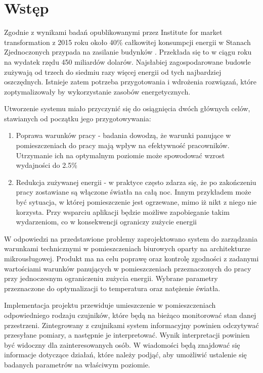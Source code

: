 \newpage %
\section{Wstęp}

Zgodnie z wynikami badań opublikowanymi przez Institute for market transformation z 
2015 roku około 40\% całkowitej konsumpcji energii w Stanach Zjednoczonych przypada na zasilanie budynków 
\cite{Imt.org2015}. Przekłada się to w ciągu roku na wydatek rzędu 450 miliardów 
dolarów. Najsłabiej zagospodarowane budowle zużywają od trzech do siedmiu razy więcej 
energii od tych najbardziej oszczędnych. Istnieje zatem potrzeba przygotowania 
i wdrożenia rozwiązań, które zoptymalizowały by wykorzystanie zasobów energetycznych. 

Utworzenie systemu miało przyczynić się do osiągnięcia dwóch głównych 
celów, stawianych od początku jego przygotowywania:

\begin{enumerate}
    \item Poprawa warunków pracy - badania \cite{oseland2012} dowodzą, że 
    warunki panujące w pomieszczeniach do pracy mają wpływ na efektywność pracowników. 
    Utrzymanie ich na optymalnym poziomie może spowodować wzrost wydajności do 2.5\%
    \item Redukcja zużywanej energii - w praktyce często zdarza się, że po zakończeniu 
    pracy zostawiane są włączone światła na całą noc. Innym przykładem może być 
    sytuacja, w której pomieszczenie jest ogrzewane, mimo iż nikt z niego nie korzysta. 
    Przy wsparciu aplikacji będzie możliwe zapobieganie takim wydarzeniom, co w 
    konsekwencji ograniczy zużycie energii
\end{enumerate}

W odpowiedzi na przedstawione problemy zaprojektowano system do 
zarządzania warunkami technicznymi w pomieszczeniach biurowych oparty na architekturze 
mikrousługowej. Produkt ma na celu poprawę oraz kontrolę zgodności z zadanymi 
wartościami warunków panujących w pomieszczeniach 
przeznaczonych do pracy przy jednoczesnym ograniczeniu zużycia energii. 
Wybrane parametry przeznaczone do optymalizacji to temperatura oraz natężenie światła.

Implementacja projektu przewiduje umieszczenie w pomieszczeniach odpowiedniego 
rodzaju czujników, które będą na bieżąco monitorować stan danej przestrzeni. 
Zintegrowany z czujnikami system informacyjny powinien odczytywać przesyłane 
pomiary, a następnie je interpretować. Wynik interpretacji powinien być widoczny dla 
zainteresowanych osób. W wiadomości będą znajdować się informacje dotyczące 
działań, które należy podjąć, aby umożliwić ustalenie się badanych parametrów na 
właściwym poziomie.

